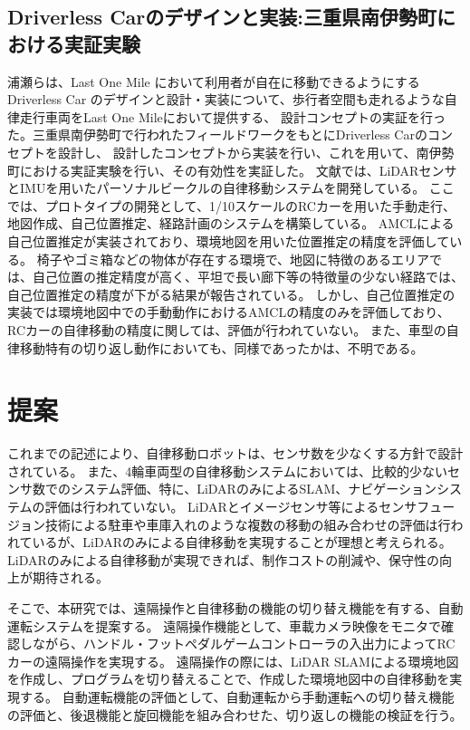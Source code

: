 \subsection{Driverless Carのデザインと実装:三重県南伊勢町における実証実験}
浦瀬ら\cite{auto:design}は、Last One Mile において利用者が自在に移動できるようにする
Driverless Car のデザインと設計・実装について、歩行者空間も走れるような自律走行車両をLast One Mileにおいて提供する、
設計コンセプトの実証を行った。三重県南伊勢町で行われたフィールドワークをもとにDriverless Carのコンセプトを設計し、
設計したコンセプトから実装を行い、これを用いて、南伊勢町における実証実験を行い、その有効性を実証した。
文献では、LiDARセンサとIMUを用いたパーソナルビークルの自律移動システムを開発している。
ここでは、プロトタイプの開発として、1/10スケールのRCカーを用いた手動走行、地図作成、自己位置推定、経路計画のシステムを構築している。
AMCLによる自己位置推定が実装されており、環境地図を用いた位置推定の精度を評価している。
椅子やゴミ箱などの物体が存在する環境で、地図に特徴のあるエリアでは、自己位置の推定精度が高く、平坦で長い廊下等の特徴量の少ない経路では、自己位置推定の精度が下がる結果が報告されている。
しかし、自己位置推定の実装では環境地図中での手動動作におけるAMCLの精度のみを評価しており、RCカーの自律移動の精度に関しては、評価が行われていない。
また、車型の自律移動特有の切り返し動作においても、同様であったかは、不明である。

\section{提案}
これまでの記述により、自律移動ロボットは、センサ数を少なくする方針で設計されている。
また、4輪車両型の自律移動システムにおいては、比較的少ないセンサ数でのシステム評価、特に、LiDARのみによるSLAM、ナビゲーションシステムの評価は行われていない。
LiDARとイメージセンサ等によるセンサフュージョン技術による駐車や車庫入れのような複数の移動の組み合わせの評価は行われているが、LiDARのみによる自律移動を実現することが理想と考えられる。
LiDARのみによる自律移動が実現できれば、制作コストの削減や、保守性の向上が期待される。

そこで、本研究では、遠隔操作と自律移動の機能の切り替え機能を有する、自動運転システムを提案する。
遠隔操作機能として、車載カメラ映像をモニタで確認しながら、ハンドル・フットペダルゲームコントローラの入出力によってRCカーの遠隔操作を実現する。
遠隔操作の際には、LiDAR SLAMによる環境地図を作成し、プログラムを切り替えることで、作成した環境地図中の自律移動を実現する。
自動運転機能の評価として、自動運転から手動運転への切り替え機能の評価と、後退機能と旋回機能を組み合わせた、切り返しの機能の検証を行う。

